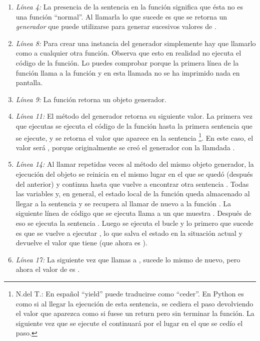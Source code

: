 \begin{enumerate}

\item \emph{Línea 4:} La presencia de la sentencia  en la función  significa que ésta no es una función ``normal''. Al llamarla lo que sucede es que se retorna un \emph{generador} que puede utilizarse para generar sucesivos valores de .

\item \emph{Línea 8:} Para crear una instancia del generador  simplemente hay que llamarlo como a cualquier otra función. Observa que esto en realidad no ejecuta el código de la función. Lo puedes comprobar porque la primera línea de la función  llama a la función  y en esta llamada no se ha imprimido nada en pantalla.

\item \emph{Línea 9:} La función  retorna un objeto generador.

\item \emph{Línea 11:} El método  del generador retorna su siguiente valor. La primera vez que ejecutas  se ejecuta el código de la función  hasta la primera sentencia  que se ejecute, y se retorna el valor que aparece en la sentencia \footnote{N.del T.: En español ``yield'' puede traducirse como ``ceder''. En Python es como si al llegar la ejecución de esta sentencia, se cediera el paso devolviendo el valor que aparezca como si fuese un return pero sin terminar la función. La siguiente vez que se ejecute el  continuará por el lugar en el que se cedío el paso.}. En este caso, el valor será , porque originalmente se creó el generador con la llamdada .

\item \emph{Línea 14:} Al llamar repetidas veces al método  del mismo objeto generador, la ejecución del objeto se reinicia en el mismo lugar en el que se quedó (después del  anterior) y continua hasta que vuelve a encontrar otra sentencia . Todas las variables y, en general, el estado local de la función queda almacenado al llegar a la sentencia  y se recupera al llamar de nuevo a la función . La siguiente línea de código que se ejecuta llama a un  que muestra . Después de eso se ejecuta la sentencia . Luego se ejecuta el bucle  y lo primero que sucede es que se vuelve a ejecutar , lo que salva el estado en la situación actual y devuelve el valor que tiene  (que ahora es ).

\item \emph{Línea 17:} La siguiente vez que  llamas a , sucede lo mismo de nuevo, pero ahora el valor de  es .

\end{enumerate}


